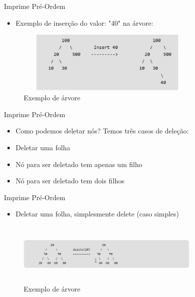 \begin{frame}
	\begin{block}{Imprime Pré-Ordem}
		\begin{itemize}
			\item Exemplo de inserção do valor: "40" na árvore:
		\end{itemize}
		\begin{figure}[!htb]
			\centering	  				
			\includegraphics[height=3cm, width = 9cm]{./pic/insercao.jpg}
			\caption{Exemplo de árvore \cite{GEEKS_2018}}
		\end{figure}
	\end{block}
\end{frame}


\begin{frame}
	\begin{block}{Imprime Pré-Ordem}
		\begin{itemize}
			\item Como podemos deletar nós? Temos três casos de deleção:

			\item Deletar uma folha
			
			\item Nó para ser deletado tem apenas um filho
			
			\item Nó para ser deletado tem dois filhos
		\end{itemize}
	\end{block}
\end{frame}


\begin{frame}
	\begin{block}{Imprime Pré-Ordem}
		\begin{itemize}
			\item Deletar uma folha, simplesmente delete (caso simples)
		\end{itemize}
		\begin{figure}[!htb]
			\centering	  				
			\includegraphics[height=3cm, width = 9cm]{./pic/delecao1.jpg}
			\caption{Exemplo de árvore \cite{GEEKS_2018}}
		\end{figure}
	\end{block}
\end{frame}

